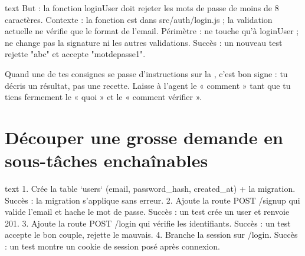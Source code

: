 \begin{extraitcode}{text}
But       : la fonction loginUser doit rejeter les mots de passe
            de moins de 8 caractères.
Contexte  : la fonction est dans src/auth/login.js ; la validation
            actuelle ne vérifie que le format de l'email.
Périmètre : ne touche qu'à loginUser ; ne change pas la signature
            ni les autres validations.
Succès    : un nouveau test rejette "abc" et accepte "motdepasse1".
\end{extraitcode}


\begin{astuce}
Quand une de tes consignes se passe d'instructions sur la , c'est
bon signe : tu décris un résultat, pas une recette. Laisse à l'agent le « comment »
tant que tu tiens fermement le « quoi » et le « comment vérifier ».
\end{astuce}

\section{Découper une grosse demande en sous-tâches enchaînables}



\begin{extraitcode}{text}
1. Crée la table `users` (email, password_hash, created_at)
   + la migration. Succès : la migration s'applique sans erreur.
2. Ajoute la route POST /signup qui valide l'email et hache
   le mot de passe. Succès : un test crée un user et renvoie 201.
3. Ajoute la route POST /login qui vérifie les identifiants.
   Succès : un test accepte le bon couple, rejette le mauvais.
4. Branche la session sur /login. Succès : un test montre
   un cookie de session posé après connexion.
\end{extraitcode}

